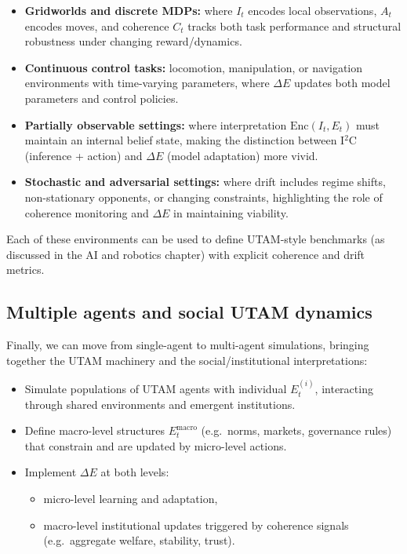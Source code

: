 \documentclass[12pt,a4paper]{report}
\begin{document}
\begin{itemize}[leftmargin=2em]
    \item \textbf{Gridworlds and discrete MDPs:} where \(I_t\) encodes local observations, \(A_t\) encodes moves, and coherence \(C_t\) tracks both task performance and structural robustness under changing reward/dynamics.
    \item \textbf{Continuous control tasks:} locomotion, manipulation, or navigation environments with time-varying parameters, where \(\Delta E\) updates both model parameters and control policies.
    \item \textbf{Partially observable settings:} where interpretation \(\mathrm{Enc}(I_t, E_t)\) must maintain an internal belief state, making the distinction between I$^2$C (inference + action) and $\Delta E$ (model adaptation) more vivid.
    \item \textbf{Stochastic and adversarial settings:} where drift includes regime shifts, non-stationary opponents, or changing constraints, highlighting the role of coherence monitoring and $\Delta E$ in maintaining viability.
    \end{itemize}

Each of these environments can be used to define UTAM-style benchmarks (as discussed in the AI and robotics chapter) with explicit coherence and drift metrics.

\subsection*{Multiple agents and social UTAM dynamics}

Finally, we can move from single-agent to multi-agent simulations, bringing together the UTAM machinery and the social/institutional interpretations:

\begin{itemize}[leftmargin=2em]
    \item Simulate populations of UTAM agents with individual \(E_t^{(i)}\), interacting through shared environments and emergent institutions.
    \item Define macro-level structures \(E_t^{\mathrm{macro}}\) (e.g.\ norms, markets, governance rules) that constrain and are updated by micro-level actions.
    \item Implement $\Delta E$ at both levels:
    \begin{itemize}
        \item micro-level learning and adaptation,
        \item macro-level institutional updates triggered by coherence signals (e.g.\ aggregate welfare, stability, trust).
    \end{itemize}
\end{itemize}
\end{document}
